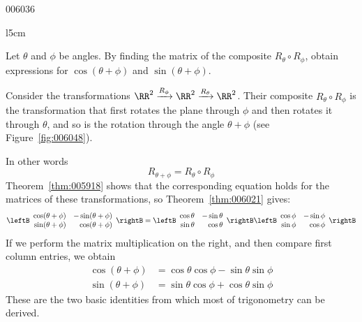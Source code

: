 \begin{example}{}{006036}
\begin{wrapfigure}[12]{l}{5cm} 
\centering

\caption{\label{fig:006048}}
\end{wrapfigure}
\setlength{\rightskip}{0pt plus 200pt}

Let $\theta$ and $\phi$ be angles. By finding the matrix of the composite $R_{\theta} \circ R_{\phi}$, obtain expressions for $\cos(\theta + \phi)$ and $\sin(\theta + \phi)$.

\begin{solution}
 Consider the transformations $\RR^2 \xrightarrow{R_{\phi}} \RR^2 \xrightarrow{R_{\theta}} \RR^2$. Their composite $R_{\theta} \circ R_{\phi}$ is the transformation that first rotates the plane through $\phi$ and then rotates it through $\theta$, and so is the rotation through the angle $\theta + \phi$ (see Figure~\ref{fig:006048}). 

In other words
\begin{equation*}
R_{\theta + \phi} = R_{\theta} \circ R_{\phi}
\end{equation*}
Theorem~\ref{thm:005918} shows that the corresponding equation holds for the matrices of these transformations, so Theorem~\ref{thm:006021} gives:
\begin{equation*}
\leftB \begin{array}{rr}
\cos(\theta + \phi) & -\sin(\theta + \phi) \\
\sin(\theta + \phi) & \cos(\theta + \phi)
\end{array} \rightB = \leftB \begin{array}{rr}
\cos \theta & -\sin \theta \\
\sin \theta & \cos \theta
\end{array} \rightB \leftB \begin{array}{rr}
\cos \phi & -\sin \phi \\
\sin \phi & \cos \phi
\end{array} \rightB
\end{equation*}
If we perform the matrix multiplication on the right, and then compare first column entries, we obtain
\begin{align*}
\cos(\theta + \phi) &= \cos \theta \cos \phi - \sin \theta \sin \phi \\
\sin(\theta + \phi) &= \sin \theta \cos \phi + \cos \theta \sin \phi
\end{align*}
These are the two basic identities from which most of trigonometry can be derived.
\end{solution}
\end{example}

